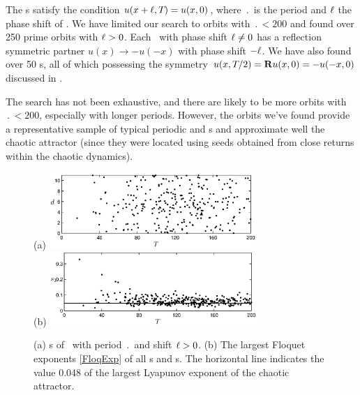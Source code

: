 

The \rpo s satisfy the condition $u(x+\ell,{T_{}}) = u(x,0)$, 
where $\period{}$ is the period and $\ell$ the phase shift of \rpo .
We have limited our search to orbits with $\period{} < 200$ and found 
over 250 prime orbits with $\ell > 0$.  Each \rpo\ with phase shift 
$\ell \neq 0$ has a reflection symmetric partner 
$u(x) \to -u(-x)$ with phase shift $-\ell$.  We have also found over
50 \po s, all of which possessing the symmetry $u(x,{T_{}}/2) = 
{\bf R} u(x,0) = -u(-x,0)$ discussed in .

The search has not been exhaustive, and there are likely to be more
orbits with $\period{} < 200$, especially with longer periods.  
However, the orbits we've found provide a representative sample of 
typical periodic and \rpo s and approximate well the chaotic 
attractor (since they were located using seeds obtained from close 
returns within the chaotic dynamics).

\begin{figure}[t]
\begin{center}
(a) \includegraphics[width=0.7\textwidth]{figs/ks22_rpos_Tdelta.eps}
\\
(b) \includegraphics[width=0.7\textwidth]{figs/ks22_rpos_lyap.eps}
\end{center}
\caption{
(a) \Rpo s of \KSe\ with period $\period{}$ and shift 
$\ell > 0$. 
(b) The largest Floquet exponents \ref{FloqExp} of all \po s
and \rpo s.  The horizontal
line indicates the value 0.048 of the largest Lyapunov exponent
of the chaotic attractor.
} \label{f:ks22rposT}
\end{figure}

